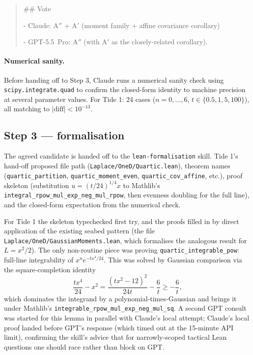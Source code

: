 \documentclass[11pt]{article}
\begin{document}
\begin{quote}
\#\# Vote
\par
- Claude: A$''$ + A$'$ (moment family + affine covariance corollary)\par
- GPT-5.5~Pro: A$''$ (with A$'$ as the closely-related corollary).
\end{quote}

\paragraph{Numerical sanity.} Before handing off to Step 3, Claude runs
a numerical sanity check using \texttt{scipy.integrate.quad} to confirm
the closed-form identity to machine precision at several parameter
values. For Tide 1: 24 cases ($n = 0,\ldots,6$, $t \in \{0.5, 1, 5, 100\}$),
all matching to $|\text{diff}| < 10^{-13}$.

\subsection{Step 3 --- formalisation}

The agreed candidate is handed off to the \texttt{lean-formalisation}
skill. Tide 1's hand-off proposed file path
(\texttt{Laplace/OneD/Quartic.lean}), theorem names
(\texttt{quartic\_partition}, \texttt{quartic\_moment\_even},
\texttt{quartic\_cov\_affine}, etc.), proof skeleton (substitution
$u = (t/24)^{1/4} x$ to Mathlib's
\texttt{integral\_rpow\_mul\_exp\_neg\_mul\_rpow}, then evenness
doubling for the full line), and the closed-form expectation from the
numerical check.

For Tide 1 the skeleton typechecked first try, and the proofs filled
in by direct application of the existing seabed pattern (the file
\texttt{Laplace/OneD/GaussianMoments.lean}, which formalises the
analogous result for $L = x^2/2$). The only non-routine piece was
proving \texttt{quartic\_integrable\_pow}: full-line integrability of
$x^n e^{-t x^4 / 24}$. This was solved by Gaussian comparison via the
square-completion identity
\[
\frac{t x^4}{24} - x^2 = \frac{(t x^2 - 12)^2}{24 t} - \frac{6}{t}
\ge -\frac{6}{t},
\]
which dominates the integrand by a polynomial-times-Gaussian and
brings it under Mathlib's
\texttt{integrable\_rpow\_mul\_exp\_neg\_mul\_sq}. A second GPT consult
was started for this lemma in parallel with Claude's local attempt;
Claude's local proof landed before GPT's response (which timed out at
the 15-minute API limit), confirming the skill's advice that for
narrowly-scoped tactical Lean questions one should race rather than
block on GPT.
\end{document}
